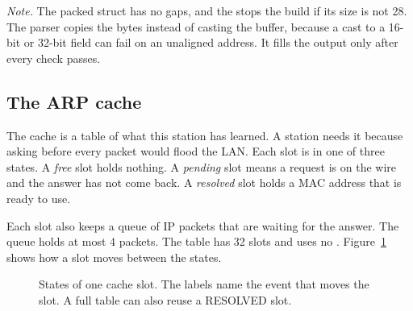 \emph{Note.} The packed struct has no gaps, and the  stops the build if its size is not 28. The parser copies the bytes instead of casting the buffer, because a cast to a 16-bit or 32-bit field can fail on an unaligned address. It fills the output only after every check passes.

\subsection{The ARP cache}\label{sec:core-cache}
The cache is a table of what this station has learned. A station needs it because asking before every packet would flood the LAN. Each slot is in one of three states. A \emph{free} slot holds nothing. A \emph{pending} slot means a request is on the wire and the answer has not come back. A \emph{resolved} slot holds a MAC address that is ready to use.

Each slot also keeps a queue of IP packets that are waiting for the answer. The queue holds at most 4 packets. The table has 32 slots and uses no . Figure~\ref{fig:core-states} shows how a slot moves between the states.

\begin{figure}[H]
\centering
{}
\caption{States of one cache slot. The labels name the event that moves the slot. A full table can also reuse a RESOLVED slot.}
\label{fig:core-states}
\end{figure}

